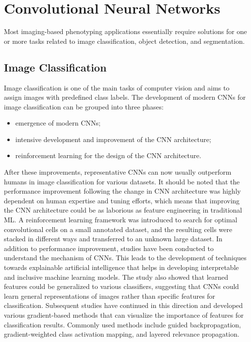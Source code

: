 \section{Convolutional Neural Networks}
Most imaging-based phenotyping applications essentially require solutions for one or more tasks related to image classification, object detection, and segmentation.

\subsection{Image Classification}
Image classification is one of the main tasks of computer vision and aims to assign images with predefined class labels.
The development of modern CNNs for image classification can be grouped into three phases:
\begin{itemize}
    \item emergence of modern CNNs;
    \item intensive development and improvement of the CNN architecture;
    \item reinforcement learning for the design of the CNN architecture.
\end{itemize}
After these improvements, representative CNNs can now usually outperform humans in image classification for various datasets. It should be noted that the performance
improvement following the change in CNN architecture was highly dependent on human expertise and tuning efforts, which means that improving the CNN architecture
could be as laborious as feature engineering in traditional ML. A reinforcement learning framework\cite{zoph2016neural} was introduced to search for optimal convolutional cells on a small
annotated dataset, and the resulting cells were stacked in different ways and transferred to an unknown large dataset. In addition to performance improvement, studies
have been conducted to understand the mechanism of CNNs. This leads to the development of techniques towards explainable artificial intelligence that helps in developing
interpretable and inclusive machine learning models. The study also showed that learned features could be generalized to various classifiers, suggesting that CNNs could
learn general representations of images rather than specific features for classification. Subsequent studies have continued in this direction and developed various
gradient-based methods that can visualize the importance of features for classification results. Commonly used methods include guided backpropagation, gradient-weighted
class activation mapping, and layered relevance propagation.



